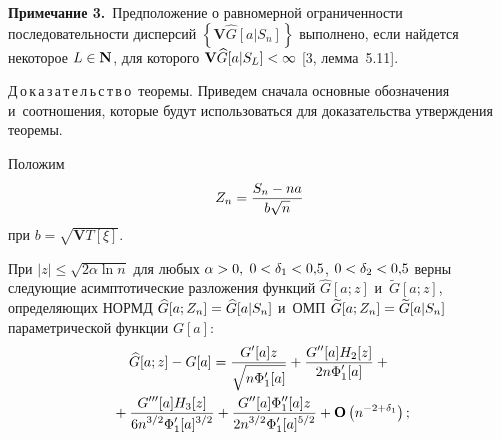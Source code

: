 \begin{multicols}{2}
\smallskip

\noindent
\textbf{Примечание 3.}\ Предположение о равномерной ограниченности 
последовательности дисперсий $\left\{\mathbf{V} \widehat{G}[a|S_n]\right\}$
 выполнено, если найдется некоторое $L\hm\in \mathbf{N}$, для которого
 $\mathbf{V} \widehat{G}[a|S_L]\hm<\infty$ [3, лемма~5.11].

\smallskip

\noindent
Д\,о\,к\,а\,з\,а\,т\,е\,л\,ь\,с\,т\,в\,о\ теоремы. 
Приведем сначала основные обозначения и~соотношения, которые будут использоваться 
для доказательства утверждения теоремы.

  Положим
 $$
 Z_n=\displaystyle\frac{\displaystyle S_n-na\mathstrut}{\displaystyle b\sqrt{n}\mathstrut}
 $$
 при $b=\sqrt{\mathbf{V}T[\xi]}.$

  При $|z|\le \sqrt {2\alpha \ln n}$ для любых $\alpha\hm>0,$
 $0\hm<\delta_1\hm<0{,}5$, $0\hm<\delta_2\hm<0{,}5$ верны следующие асимптотические 
 разложения функций $\widehat{G}[a;z]$ и~$\widetilde{G}[a;z]$, определяющих 
 НОРМД $\widehat{G}[a;Z_n]\hm=\widehat{G}[a|S_n]$ и~ОМП 
 $\widetilde{G}[a;Z_n]\hm=\widetilde{G}[a|S_n]$ параметрической функции $G[a]$:
 \begin{multline}
 \widehat{G}[a;z]-G[a]=
 \displaystyle\frac{\displaystyle G'[a] z\mathstrut}{\displaystyle \sqrt{n\Phi'_1[a]}\mathstrut}
 + \displaystyle\frac{\displaystyle G''[a] H_2[z]\mathstrut}{\displaystyle 2 n\Phi'_1[a]\mathstrut}
 +{}\\
 \!{}+ \displaystyle\frac{\displaystyle G'''[a] H_3[z]\mathstrut}{\displaystyle 6 n^{3/2}\Phi'_1[a]^{3/2}\mathstrut}+ \displaystyle\frac{\displaystyle G''[a]\Phi''_1[a] z\mathstrut}{\displaystyle 2 n^{3/2}\Phi'_1[a]^{5/2} \mathstrut}
 + \mathbf{O}\left( {n^{-2+\delta_1} } \right);\!\!
 \label{e7-ch}
\end{multline}

\vspace*{-12pt}



\end{multicols}
